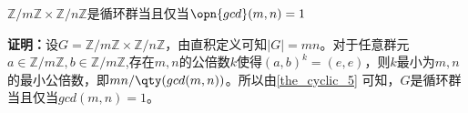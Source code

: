 \begin{corollary}{}
$\mathbb{Z} / m \mathbb{Z} \times \mathbb{Z} / n \mathbb{Z}$是循环群当且仅当$\opn{gcd}(m,n)=1$
\end{corollary}
\textbf{证明：}设$G=\mathbb{Z} / m \mathbb{Z} \times \mathbb{Z} / n \mathbb{Z}$，由直积定义可知$|G|=mn$。对于任意群元$a\in \mathbb{Z} / m \mathbb{Z},b\in \mathbb{Z} / m \mathbb{Z}$,存在$m,n$的公倍数$k$使得$(a,b)^k=(e,e)$，则$k$最小为$m,n$的最小公倍数，即$mn/\qty(gcd(m,n))$。所以由\autoref{the_cyclic_5}  可知，$G$是循环群当且仅当$gcd(m,n)=1$。